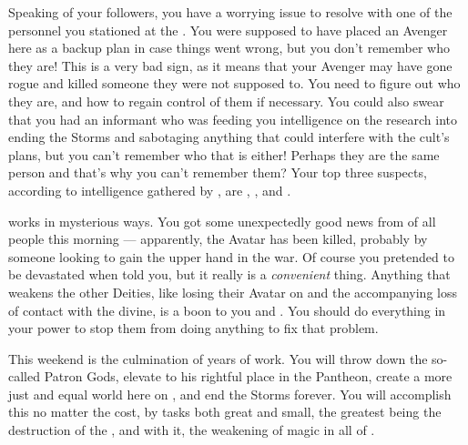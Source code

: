 \documentclass[char]{GL2020}
\begin{document}
Speaking of your followers, you have a worrying issue to resolve with one of the personnel you stationed at the \pSc{}. You were supposed to have placed an Avenger here as a backup plan in case things went wrong, but you don't remember who they are! This is a very bad sign, as it means that your Avenger may have gone rogue and killed someone they were not supposed to. You need to figure out who they are, and how to regain control of them if necessary. You could also swear that you had an informant who was feeding you intelligence on the \pTech{} research into ending the Storms and sabotaging anything that could interfere with the cult's plans, but you can't remember who that is either! Perhaps they are the same person and that's why you can't remember them? Your top three suspects, according to intelligence gathered by \cChupSecond{}, are \cInterpol{\full}, \cChupAvenger{\full}, and \cWildCard{\full}.

\cGenesis{} works in mysterious ways. You got some unexpectedly good news from \cEbbPriest{} of all people this morning — apparently, the \cEbb{} Avatar has been killed, probably by someone looking to gain the upper hand in the war. Of course you pretended to be devastated when \cEbbPriest{\they} told you, but it really is a \emph{convenient} thing. Anything that weakens the other Deities, like losing their Avatar on \pEarth{} and the accompanying loss of contact with the divine, is a boon to you and \cGenesis{}. You should do everything in your power to stop them from doing anything to fix that problem.

This weekend is the culmination of years of work. You will throw down the so-called Patron Gods, elevate \cGenesis{} to his rightful place in the Pantheon, create a more just and equal world here on \pEarth{}, and end the Storms forever. You will accomplish this no matter the cost, by tasks both great and small, the greatest being the destruction of the \pSchool{}, and with it, the weakening of magic in all of \pEarth{}.
\end{document}
